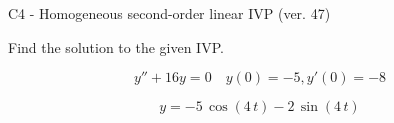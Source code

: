 \begin{exercise}
  \begin{exerciseTitle}C4 - Homogeneous second-order linear IVP (ver. 47)\end{exerciseTitle}
  \begin{exerciseStatement}
    
Find the solution to the given IVP.

    
\[y''+16y = 0 \hspace{1em} y(0) = -5 , y'(0) = -8\]

  \end{exerciseStatement}
  \begin{exerciseAnswer}
    
\[y= -5 \, \cos\left(4 \, t\right) - 2 \, \sin\left(4 \, t\right)\]

  \end{exerciseAnswer}
\end{exercise}